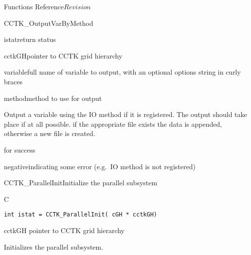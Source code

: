 \begin{cactuspart}{ Functions Reference}{}{$Revision$}
\begin{FunctionDescription}{CCTK\_OutputVarByMethod}
\begin{ParameterSection}
\begin{Parameter}{istat}return status\end{Parameter}
\begin{Parameter}{cctkGH}pointer to CCTK grid hierarchy\end{Parameter}
\begin{Parameter}{variable}full name of variable to output, with an optional
options string in curly braces\end{Parameter}
\begin{Parameter}{method}method to use for output\end{Parameter}
\end{ParameterSection}

\begin{Discussion}
Output a variable  using the IO method  if it is
registered. The output should take place if at all possible.
if the appropriate file exists the data is appended, otherwise a new
file is created.
\end{Discussion}

\begin{ErrorSection}
\begin{Error}{0}for success\end{Error}
\begin{Error}{negative}indicating some error (e.g.\ IO method is not registered)\end{Error}
\end{ErrorSection}
\end{FunctionDescription}




\begin{FunctionDescription}{CCTK\_ParallelInit}{Initialize the parallel subsystem}
\label{CCTK-ParallelInit}
\begin{SynopsisSection}
\begin{Synopsis}{C}
\begin{verbatim}int istat = CCTK_ParallelInit( cGH * cctkGH)\end{verbatim}
\end{Synopsis}
\end{SynopsisSection}
\begin{ParameterSection}
\begin{Parameter}{cctkGH}
pointer to CCTK grid hierarchy
\end{Parameter}
\end{ParameterSection}
\begin{Discussion}
Initializes the parallel subsystem.
\end{Discussion}
\end{FunctionDescription}



\end{cactuspart}
